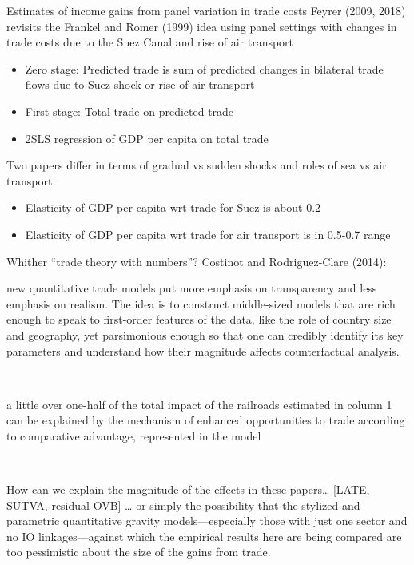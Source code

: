 \documentclass[10pt,notes=hide,aspectratio=169]{beamer}
\begin{document}
\begin{frame}{Estimates of income gains from panel variation in trade costs}
Feyrer (2009, 2018) revisits the Frankel and Romer (1999) idea using 
panel settings with changes in trade costs due to the Suez Canal and rise of air transport
\begin{itemize}
	\item Zero stage: Predicted trade is sum of predicted changes in bilateral trade flows due to Suez shock or rise of air transport
	\item First stage: Total trade on predicted trade
	\item 2SLS regression of GDP per capita on total trade
\end{itemize}
Two papers differ in terms of gradual vs sudden shocks and roles of sea vs air transport \\
\begin{itemize}
	\item Elasticity of GDP per capita wrt trade for Suez is about 0.2
	\item Elasticity of GDP per capita wrt trade for air transport is in 0.5-0.7 range
\end{itemize}
\end{frame}
\begin{frame}{Whither ``trade theory with numbers''?}
Costinot and Rodriguez-Clare (2014): \\
{\small
new quantitative trade models put more emphasis on transparency and less emphasis on realism. The idea is to construct middle-sized models that are rich enough to speak to first-order features of the data, like the role of country size and geography, yet parsimonious enough so that one can credibly identify its key parameters and understand how their magnitude affects counterfactual analysis.\par}
 \\
{\small a little over one-half of the total impact of the railroads estimated in column 1 can be explained by the mechanism of enhanced opportunities to trade according to comparative advantage, represented in the model\par}
 \\
{\small How can we explain the magnitude of the effects in these papers\dots
[LATE, SUTVA, residual OVB]
\dots
or simply the possibility that the stylized and parametric quantitative gravity models—especially those with just one sector and no IO linkages—against which the empirical results here are being compared are too pessimistic about the size of the gains from trade.
\par}
\end{frame}
\end{document}
